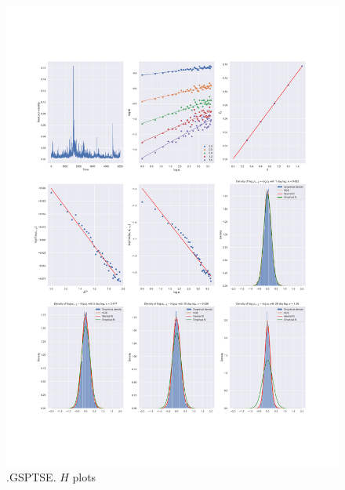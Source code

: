 	\begin{figure}[h]
		\centering
		\includegraphics[width=\linewidth]{fig/.GSPTSE.pdf}
		\caption{.GSPTSE. $\hat{H}$ plots}
	\end{figure}

